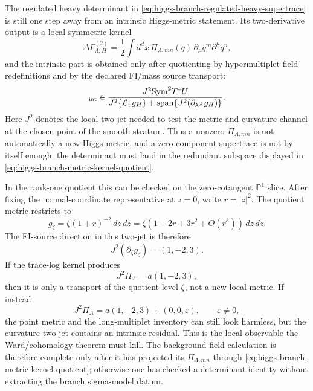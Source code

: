 \begin{example}
\label{ex:higgs-branch-metric-transport-projection}
The regulated heavy determinant in
\eqref{eq:higgs-branch-regulated-heavy-supertrace} is still one step away from
an intrinsic Higgs-metric statement.  Its two-derivative output is a local
symmetric kernel
\begin{equation}
  \Delta\Gamma_{\Lambda,H}^{(2)}
  =
  \frac12\int d^dx\,
  \Pi_{\Lambda,mn}(q)\,
  \partial_\mu q^m\partial^\mu q^n ,
  \label{eq:higgs-branch-metric-kernel-output}
\end{equation}
and the intrinsic part is obtained only after quotienting by hypermultiplet
field redefinitions and by the declared FI/mass source transport:
\begin{equation}
  [\Pi_\Lambda]_{\rm int}
  \in
  \frac{J^2{\rm Sym}^2T^\ast U}
       {J^2\{\mathcal L_v g_H\}
        +
        {\rm span}\{J^2(\partial_{\lambda^A}g_H)\}} .
  \label{eq:higgs-branch-metric-kernel-quotient}
\end{equation}
Here \(J^2\) denotes the local two-jet needed to test the metric and curvature
channel at the chosen point of the smooth stratum.  Thus a nonzero
\(\Pi_{\Lambda,mn}\) is not automatically a new Higgs metric, and a zero
component supertrace is not by itself enough: the determinant must land in the
redundant subspace displayed in
\eqref{eq:higgs-branch-metric-kernel-quotient}.

In the rank-one quotient this can be checked on the zero-cotangent
\(\mathbb P^1\) slice.  After fixing the normal-coordinate representative at
\(z=0\), write \(r=|z|^2\).  The quotient metric restricts to
\[
  g_\zeta
  =
  \zeta(1+r)^{-2}\,dz\,d\bar z
  =
  \zeta(1-2r+3r^2+O(r^3))\,dz\,d\bar z .
\]
The FI-source direction in this two-jet is therefore
\begin{equation}
  J^2(\partial_\zeta g_\zeta)=(1,-2,3).
  \label{eq:higgs-branch-cp1-slice-source-jet}
\end{equation}
If the trace-log kernel produces
\[
  J^2\Pi_\Lambda=a(1,-2,3),
\]
then it is only a transport of the quotient level \(\zeta\), not a new local
metric.  If instead
\begin{equation}
  J^2\Pi_\Lambda=a(1,-2,3)+(0,0,\varepsilon),
  \qquad \varepsilon\ne0,
  \label{eq:higgs-branch-intrinsic-jet-residual}
\end{equation}
the point metric and the long-multiplet inventory can still look harmless, but
the curvature two-jet contains an intrinsic residual.  This is the local
observable the Ward/cohomology theorem must kill.  The background-field
calculation is therefore complete only after it has projected its
\(\Pi_{\Lambda,mn}\) through
\eqref{eq:higgs-branch-metric-kernel-quotient}; otherwise one has checked a
determinant identity without extracting the branch sigma-model datum.
\end{example}

